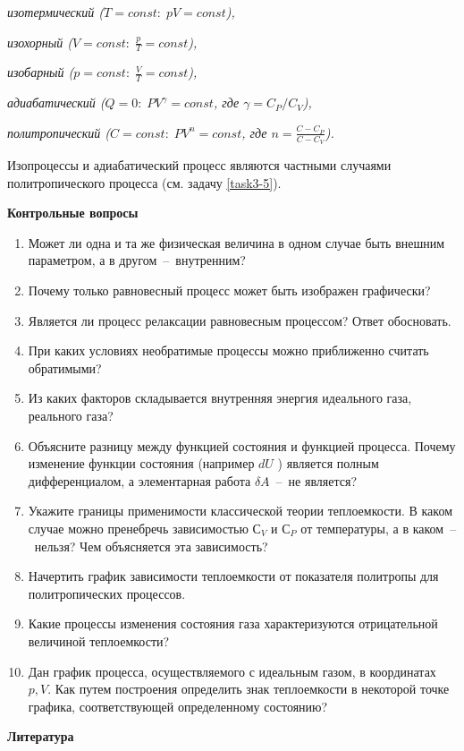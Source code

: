 \emph{изотермический ($T = const:\; pV = const$),}

\emph{изохорный ($V = const:\; \frac{p}{T} = const$),}

\emph{изобарный ($p = const:\; \frac{V}{T} = const$),}

\emph{адиабатический ($Q = 0:\; PV^\gamma = const$, где $\gamma = C_P/C_V$),}

\emph{политропический ($C = const:\; PV^n = const$, где $n = \frac{C - C_P}{C - C_V}$).}

Изопроцессы и адиабатический процесс являются частными случаями
политропического процесса (см. задачу \ref{task3-5}).

\textbf{Контрольные вопросы}
\begin{enumerate}
  \item Может ли одна и та же физическая величина в одном случае быть внешним
  параметром, а в другом~--~внутренним?
  \item Почему только равновесный процесс может быть изображен графически?
  \item Является ли процесс релаксации равновесным процессом? Ответ
  обосновать.
  \item При каких условиях необратимые процессы можно приближенно считать
  обратимыми?
  \item Из каких факторов складывается внутренняя энергия идеального газа,
  реального газа?
  \item Объясните разницу между функцией состояния и функцией процесса. Почему изменение функции состояния (например $dU$ ) является полным дифференциалом, а элементарная работа  $δA$~--~не является?
  \item Укажите границы применимости классической теории теплоемкости. В каком случае можно пренебречь зависимостью $С_V$ и $С_P$ от температуры, а в каком~--~нельзя? Чем
  объясняется эта зависимость?
  \item Начертить график зависимости теплоемкости от показателя политропы для
  политропических процессов.
  \item Какие процессы изменения состояния газа характеризуются отрицательной
  величиной теплоемкости?
  \item Дан график процесса, осуществляемого с идеальным газом, в координатах $p, V$. Как путем построения определить знак теплоемкости в некоторой точке графика, соответствующей определенному состоянию?
\end{enumerate}

\textbf{Литература}

